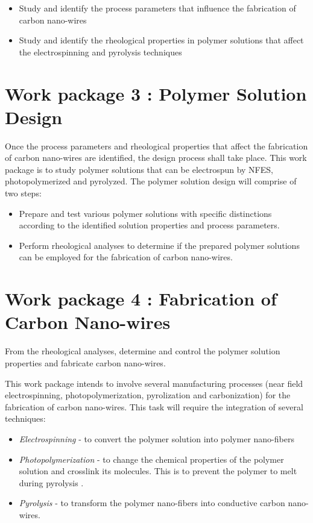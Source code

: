 \begin{itemize}
	\item Study and identify the process parameters that influence the fabrication of carbon nano-wires
	\item Study and identify the rheological properties in polymer solutions that affect the electrospinning and pyrolysis techniques
\end{itemize}

\section{Work package 3 : Polymer Solution Design}
Once the process parameters and rheological properties that affect the fabrication of carbon nano-wires are identified, the design process shall take place. This work package is to study polymer solutions that can be electrospun by NFES, photopolymerized and pyrolyzed. The polymer solution design will comprise of two steps:

\begin{itemize}
	\item Prepare and test various polymer solutions with specific distinctions according to the identified solution properties and process parameters.
	\item Perform rheological analyses to determine if the prepared polymer solutions can be employed for the fabrication of carbon nano-wires.
\end{itemize}

\section{Work package 4 : Fabrication of Carbon Nano-wires}
From the rheological analyses, determine and control the polymer solution properties and fabricate carbon nano-wires.
	
This work package intends to involve several manufacturing processes (near field electrospinning, photopolymerization, pyrolization and carbonization) for the fabrication of carbon nano-wires. This task will require the integration of several techniques:

\begin{itemize}
	\item \emph{Electrospinning} - to convert the polymer solution into polymer nano-fibers
	\item \emph{Photopolymerization} - to change the chemical properties of the polymer solution and crosslink its molecules. This is to prevent the polymer to melt during pyrolysis \cite{Basu2018}.
	\item \emph{Pyrolysis} - to transform the polymer nano-fibers into conductive carbon nano-wires.
\end{itemize}

